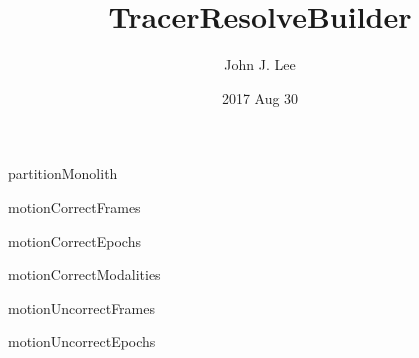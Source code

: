 \documentclass{beamer}
\title{TracerResolveBuilder}
\author{John J. Lee}
\date{2017 Aug 30}
\begin{document}
\begin{frame}
\titlepage
\end{frame}

\begin{frame}{partitionMonolith}

\end{frame}

\begin{frame}{motionCorrectFrames}

\end{frame}

\begin{frame}{motionCorrectEpochs}

\end{frame}

\begin{frame}{motionCorrectModalities}

\end{frame}

\begin{frame}{motionUncorrectFrames}

\end{frame}

\begin{frame}{motionUncorrectEpochs}

\end{frame}

\begin{frame}{}

\end{frame}

\begin{frame}{}

\end{frame}

\begin{frame}{}

\end{frame}
\end{document}
